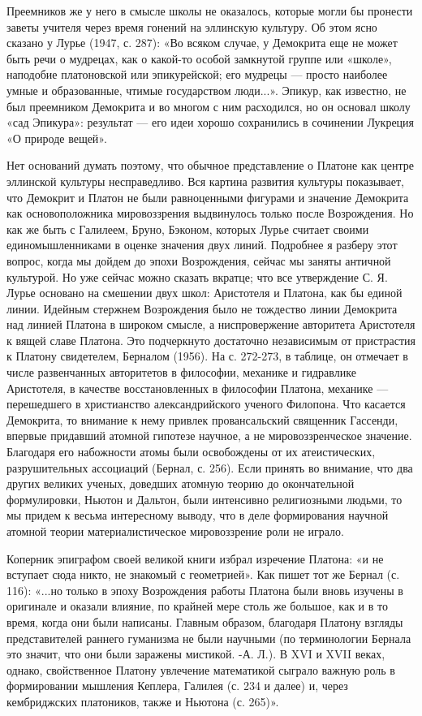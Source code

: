 Преемников же у него в смысле школы не оказалось, которые могли бы
пронести заветы учителя через время гонений на эллинскую культуру. Об
этом ясно сказано у Лурье (1947, с. 287): «Во всяком случае, у
Демокрита еще не может быть речи о мудрецах, как о какой-то особой
замкнутой группе или «школе», наподобие платоновской или эпикурейской;
его мудрецы --- просто наиболее умные и образованные, чтимые
государством люди...». Эпикур, как известно, не был преемником
Демокрита и во многом с ним расходился, но он основал школу «сад
Эпикура»: результат --- его идеи хорошо сохранились в сочинении
Лукреция «О природе вещей».

Нет оснований думать поэтому, что обычное представление о Платоне как
центре эллинской культуры несправедливо. Вся картина развития культуры
показывает, что Демокрит и Платон не были равноценными фигурами и
значение Демокрита как основоположника мировоззрения выдвинулось
только после Возрождения. Но как же быть с Галилеем, Бруно, Бэконом,
которых Лурье считает своими единомышленниками в оценке значения двух
линий. Подробнее я разберу этот вопрос, когда мы дойдем до эпохи
Возрождения, сейчас мы заняты античной культурой. Но уже сейчас можно
сказать вкратце; что все утверждение С. Я. Лурье основано на смешении
двух школ: Аристотеля и Платона, как бы единой линии. Идейным стержнем
Возрождения было не тождество линии Демокрита над линией Платона в
широком смысле, а ниспровержение авторитета Аристотеля к вящей славе
Платона. Это подчеркнуто достаточно независимым от пристрастия к
Платону свидетелем, Берналом (1956). На с. 272-273, в таблице, он
отмечает в числе развенчанных авторитетов в философии, механике и
гидравлике Аристотеля, в качестве восстановленных в философии Платона,
механике --- перешедшего в христианство александрийского ученого
Филопона. Что касается Демокрита, то внимание к нему привлек
провансальский священник Гассенди, впервые придавший атомной гипотезе
научное, а не мировоззренческое значение. Благодаря его набожности
атомы были освобождены от их атеистических, разрушительных ассоциаций
(Бернал, с. 256). Если принять во внимание, что два других великих
ученых, доведших атомную теорию до окончательной формулировки, Ньютон
и Дальтон, были интенсивно религиозными людьми, то мы придем к весьма
интересному выводу, что в деле формирования научной атомной теории
материалистическое мировоззрение роли не играло.

Коперник эпиграфом своей великой книги избрал изречение Платона: «и не
вступает сюда никто, не знакомый с геометрией». Как пишет тот же
Бернал (с. 116): «...но только в эпоху Возрождения работы Платона были
вновь изучены в оригинале и оказали влияние, по крайней мере столь же
большое, как и в то время, когда они были написаны. Главным образом,
благодаря Платону взгляды представителей раннего гуманизма не были
научными (по терминологии Бернала это значит, что они были заражены
мистикой. -А. Л.). В XVI и XVII веках, однако, свойственное Платону
увлечение математикой сыграло важную роль в формировании мышления
Кеплера, Галилея (с. 234 и далее) и, через кембриджских платоников,
также и Ньютона (с. 265)».

